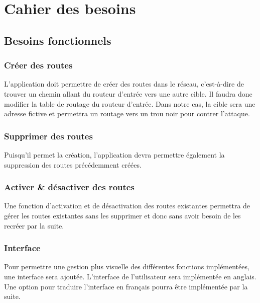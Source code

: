 \chapter{Cahier des besoins}

\section{Besoins fonctionnels}

\subsection{Créer des routes}
L'application doit permettre de créer des routes dans le réseau, c'est-à-dire de trouver un chemin allant du routeur d'entrée vers une autre cible. Il faudra donc modifier la table de routage du routeur d'entrée. Dans notre cas, la cible sera une adresse fictive et permettra un routage vers un trou noir pour contrer l'attaque.

\subsection{Supprimer des routes}
Puisqu'il permet la création, l'application devra permettre également la suppression des routes précédemment créées.

\subsection{Activer \& désactiver des routes}
Une fonction d'activation et de désactivation des routes existantes permettra de gérer les routes existantes sans les supprimer et donc sans avoir besoin de les recréer par la suite.

\subsection{Interface}
Pour permettre une gestion plus visuelle des différentes fonctions implémentées, une interface sera ajoutée. L'interface de l'utilisateur sera implémentée en anglais. Une option pour traduire l'interface en français pourra être implémentée par la suite.


